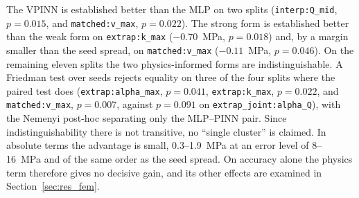The VPINN is established better than the MLP on two splits (\texttt{interp:Q\_mid}, $p=0.015$, and \texttt{matched:v\_max}, $p=0.022$). The strong form is established better than the weak form on \texttt{extrap:k\_max} ($-0.70$~MPa, $p=0.018$) and, by a margin smaller than the seed spread, on \texttt{matched:v\_max} ($-0.11$~MPa, $p=0.046$). On the remaining eleven splits the two physics-informed forms are indistinguishable. A Friedman test over seeds \citep{friedman1937,demsar2006} rejects equality on three of the four splits where the paired test does (\texttt{extrap:alpha\_max}, $p=0.041$, \texttt{extrap:k\_max}, $p=0.022$, and \texttt{matched:v\_max}, $p=0.007$, against $p=0.091$ on \texttt{extrap\_joint:alpha\_Q}), with the Nemenyi post-hoc separating only the MLP--PINN pair. Since indistinguishability there is not transitive, no ``single cluster'' is claimed. In absolute terms the advantage is small, 0.3--1.9~MPa at an error level of 8--16~MPa and of the same order as the seed spread. On accuracy alone the physics term therefore gives no decisive gain, and its other effects are examined in Section~\ref{sec:res_fem}.

